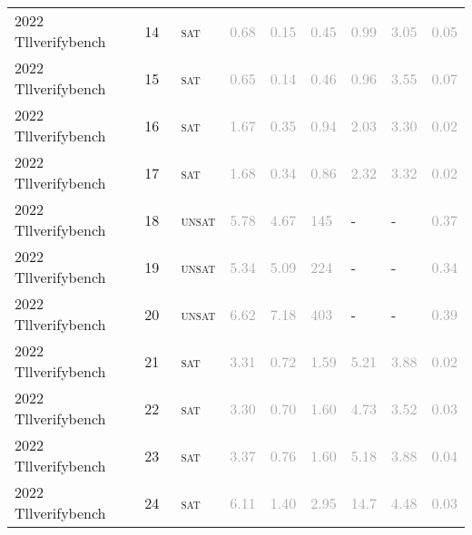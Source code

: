 \begin{center}
{\begin{longtable}{@{}lllllllll@{}}
2022 Tllverifybench & 14 & ~\textsc{sat} & \textcolor{darkgray}{0.68} & \textcolor{darkgray}{0.15} & \textcolor{darkgray}{0.45} & \textcolor{darkgray}{0.99} & \textcolor{darkgray}{3.05} & \textcolor{darkgray}{0.05} \\
2022 Tllverifybench & 15 & ~\textsc{sat} & \textcolor{darkgray}{0.65} & \textcolor{darkgray}{0.14} & \textcolor{darkgray}{0.46} & \textcolor{darkgray}{0.96} & \textcolor{darkgray}{3.55} & \textcolor{darkgray}{0.07} \\
2022 Tllverifybench & 16 & ~\textsc{sat} & \textcolor{darkgray}{1.67} & \textcolor{darkgray}{0.35} & \textcolor{darkgray}{0.94} & \textcolor{darkgray}{2.03} & \textcolor{darkgray}{3.30} & \textcolor{darkgray}{0.02} \\
2022 Tllverifybench & 17 & ~\textsc{sat} & \textcolor{darkgray}{1.68} & \textcolor{darkgray}{0.34} & \textcolor{darkgray}{0.86} & \textcolor{darkgray}{2.32} & \textcolor{darkgray}{3.32} & \textcolor{darkgray}{0.02} \\
2022 Tllverifybench & 18 & ~\textsc{unsat} & \textcolor{darkgray}{5.78} & \textcolor{darkgray}{4.67} & \textcolor{darkgray}{145} & - & - & \textcolor{darkgray}{0.37} \\
2022 Tllverifybench & 19 & ~\textsc{unsat} & \textcolor{darkgray}{5.34} & \textcolor{darkgray}{5.09} & \textcolor{darkgray}{224} & - & - & \textcolor{darkgray}{0.34} \\
2022 Tllverifybench & 20 & ~\textsc{unsat} & \textcolor{darkgray}{6.62} & \textcolor{darkgray}{7.18} & \textcolor{darkgray}{403} & - & - & \textcolor{darkgray}{0.39} \\
2022 Tllverifybench & 21 & ~\textsc{sat} & \textcolor{darkgray}{3.31} & \textcolor{darkgray}{0.72} & \textcolor{darkgray}{1.59} & \textcolor{darkgray}{5.21} & \textcolor{darkgray}{3.88} & \textcolor{darkgray}{0.02} \\
2022 Tllverifybench & 22 & ~\textsc{sat} & \textcolor{darkgray}{3.30} & \textcolor{darkgray}{0.70} & \textcolor{darkgray}{1.60} & \textcolor{darkgray}{4.73} & \textcolor{darkgray}{3.52} & \textcolor{darkgray}{0.03} \\
2022 Tllverifybench & 23 & ~\textsc{sat} & \textcolor{darkgray}{3.37} & \textcolor{darkgray}{0.76} & \textcolor{darkgray}{1.60} & \textcolor{darkgray}{5.18} & \textcolor{darkgray}{3.88} & \textcolor{darkgray}{0.04} \\
2022 Tllverifybench & 24 & ~\textsc{sat} & \textcolor{darkgray}{6.11} & \textcolor{darkgray}{1.40} & \textcolor{darkgray}{2.95} & \textcolor{darkgray}{14.7} & \textcolor{darkgray}{4.48} & \textcolor{darkgray}{0.03} \\

\end{longtable}}
\end{center}
